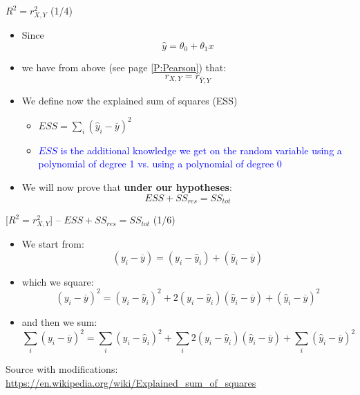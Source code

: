 \documentclass{beamer}
\begin{document}
\begin{frame}
{\centerline{$R^2 = r_{X,Y}^2$ (1/4)}}
\begin{itemize}
\item Since
$$ \hat{y} = \theta_0 + \theta_1 x$$
\item we have from above (see page \ref{P:Pearson}) that:
$$r_{X,Y} = r_{\hat{Y},Y}$$
\item We define now the explained sum of squares (ESS) 
\begin{itemize}
\item $ ESS = \sum_i (\hat{y}_i - \overline{y})^2$
\item \textcolor{blue}{$ ESS $ is the additional knowledge we get on the random variable using a polynomial of degree 1 vs. using a polynomial of degree 0}
\end{itemize}

\item We will now prove that \textbf{under our hypotheses}:
$$ESS + SS_{res} = SS_{tot} $$
\end{itemize}
\end{frame}


\begin{frame}
{\centerline{ [$R^2 = r_{X,Y}^2$] -- $ESS + SS_{res} = SS_{tot} $ (1/6)}}

\begin{itemize}
\item We start from:
$$(y_{i}-{\overline {y}})=(y_{i}-{\hat {y}}_{i})+({\hat {y}}_{i}-{\overline {y}})$$

\item which we square:
$$(y_{i}-{\overline {y}})^2=(y_{i}-{\hat {y}}_{i})^2 + 2(y_{i}-{\hat {y}}_{i})({\hat {y}}_{i}-{\overline {y}}) + ({\hat {y}}_{i}-{\overline {y}})^2$$

\item and then we sum:
$$\sum_i(y_{i}-{\overline {y}})^2=\sum_i(y_{i}-{\hat {y}}_{i})^2 + \sum_i2(y_{i}-{\hat {y}}_{i})({\hat {y}}_{i}-{\overline {y}}) + \sum_i({\hat {y}}_{i}-{\overline {y}})^2$$


\end{itemize}

\begin{center}
\tiny 
Source with modifications: \url{https://en.wikipedia.org/wiki/Explained_sum_of_squares}
\end{center}

\end{frame}
\end{document}
